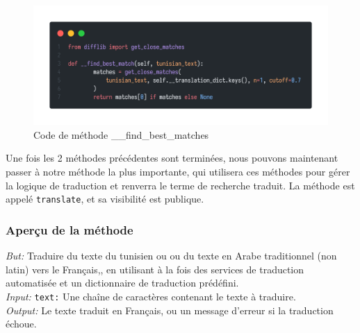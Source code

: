 \begin{figure}[H]
	\centering
	\includegraphics[width=1\textwidth]{logos/findbestmatch.png}
	\caption{Code de méthode \_\_find\_best\_matches}
	\label{fig:findbestmatch}
\end{figure}

\newpage
\noindent
Une fois les 2 méthodes précédentes sont terminées, nous pouvons maintenant passer à notre méthode la plus importante, qui utilisera ces méthodes pour gérer la logique de traduction et renverra le terme de recherche traduit. La méthode est appelé \texttt{translate}, et sa visibilité est publique.

\subsubsection{Aperçu de la méthode}
\noindent
\textit{But:} Traduire du texte du tunisien ou ou du texte en Arabe traditionnel (non latin) vers le Français,, en utilisant à la fois des services de traduction automatisée et un dictionnaire de traduction prédéfini. \\
\textit{Input:} \texttt{text:} Une chaîne de caractères contenant le texte à traduire. \\
\textit{Output:} Le texte traduit en Français, ou un message d'erreur si la traduction échoue.

\newpage
